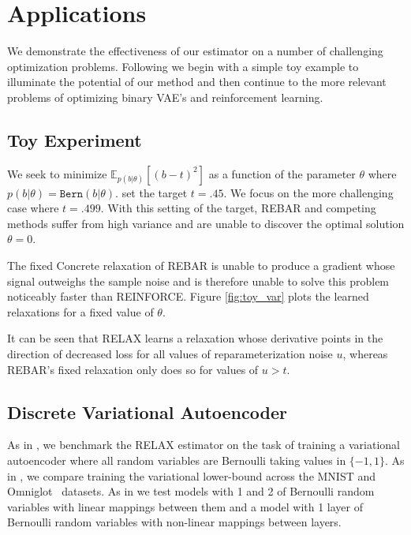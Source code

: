 \documentclass{article}
\begin{document}



\section{Applications}
\label{Applications}
We demonstrate the effectiveness of our estimator on a number of challenging optimization problems. Following \cite{tucker2017rebar} we begin with a simple toy example to illuminate the potential of our method and then continue to the more relevant problems of optimizing binary VAE's and reinforcement learning.

\subsection{Toy Experiment}
We seek to minimize $\mathbb{E}_{p(b|\theta)}[(b - t)^2]$ as a function of the parameter $\theta$ where $p(b|\theta) = \mathtt{Bern}(b|\theta)$. \cite{tucker2017rebar} set the target $t = .45$.
We focus on the more challenging case where $t = .499$.
With this setting of the target, REBAR and competing methods suffer from high variance and are unable to discover the optimal solution $\theta = 0$.

The fixed Concrete relaxation of REBAR is unable to produce a gradient whose signal outweighs the sample noise and is therefore unable to solve this problem noticeably faster than REINFORCE.
Figure \ref{fig:toy_var} plots the learned relaxations for a fixed value of $\theta$.

It can be seen that RELAX learns a relaxation whose derivative points in the direction of decreased loss for all values of reparameterization noise $u$, whereas REBAR's fixed relaxation only does so for values of $u > t$.


\subsection{Discrete Variational Autoencoder}
As in \citep{tucker2017rebar}, we benchmark the RELAX estimator on the task of training a variational autoencoder \citep{kingma2013autoencoding, rezende2014stochastic} where all random variables are Bernoulli taking values in $\{-1, 1\}$.
As in \cite{tucker2017rebar}, we compare training the variational lower-bound across the MNIST and Omniglot~\citep{lake2015human} datasets.
As in \cite{tucker2017rebar} we test models with 1 and 2 of Bernoulli random variables with linear mappings between them and a model with 1 layer of Bernoulli random variables with non-linear mappings between layers.
\end{document}
